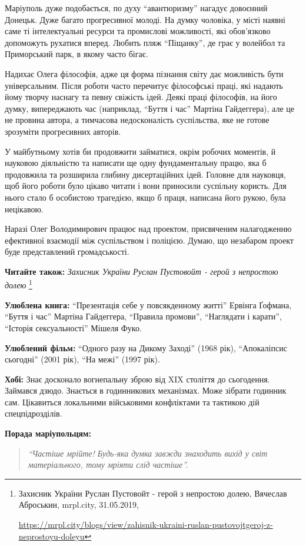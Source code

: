 Маріуполь дуже подобається, по духу \enquote{авантюризму} нагадує довоєнний Донецьк.
Дуже багато прогресивної молоді. На думку чоловіка, у місті наявні саме ті
інтелектуальні ресурси та промислові можливості, які обов'язково допоможуть
рухатися вперед. Любить пляж \enquote{Піщанку}, де грає у волейбол та Приморський парк,
в якому часто бігає.

Надихає Олега філософія, адже ця форма пізнання світу дає можливість бути
універсальним. Після роботи часто перечитує філософські праці, які надають йому
творчу наснагу та певну свіжість ідей. Деякі праці філософів, на його думку,
випереджають час (наприклад, \enquote{Буття і час} Мартіна Гайдеггера), але це не
провина автора, а тимчасова недосконалість суспільства, яке не готове зрозуміти
прогресивних авторів.


У майбутньому хотів би продовжити займатися, окрім робочих моментів, й науковою
діяльністю та написати ще одну фундаментальну працю, яка б продовжила та
розширила глибину дисертаційних ідей. Головне для науковця, щоб його роботи
було цікаво читати і вони приносили суспільну користь. Для нього стало б
особистою трагедією, якщо б праця, написана його рукою, була нецікавою.


Наразі Олег Володимирович працює над проектом, присвяченим налагодженню
ефективної взаємодії між суспільством і поліцією. Думаю, що незабаром проект
буде представлений громадськості.

\textbf{Читайте також:} \emph{Захисник України Руслан Пустовойт - герой з непростою долею}%
\footnote{Захисник України Руслан Пустовойт - герой з непростою долею, Вячеслав Аброськин, mrpl.city, 31.05.2019, \par%
\url{https://mrpl.city/blogs/view/zahisnik-ukraini-ruslan-pustovojtgeroj-z-neprostoyu-doleyu}
}


\textbf{Улюблена книга:} \enquote{Презентація себе у повсякденному житті} Ервінга Ґофмана, \enquote{Буття і час} Мартіна Гайдеггера, \enquote{Правила промови}, \enquote{Наглядати і карати}, \enquote{Історія сексуальності} Мішеля Фуко.

\textbf{Улюблений фільм:} \enquote{Одного разу на Дикому Заході} (1968 рік), \enquote{Апокаліпсис сьогодні} (2001 рік), \enquote{На межі} (1997 рік).

\textbf{Хобі:} Знає досконало вогнепальну зброю від XIX століття до сьогодення. Займався дзюдо. Знається в годинникових механізмах. Може зібрати годинник сам. Цікавиться локальними військовими конфліктами та тактикою дій спецпідрозділів.

\textbf{Порада маріупольцям:} 

\begin{quote}
\em\enquote{Частіше мрійте! Будь-яка думка завжди знаходить вихід у світ матеріального, тому мріяти слід частіше}.
\end{quote}
